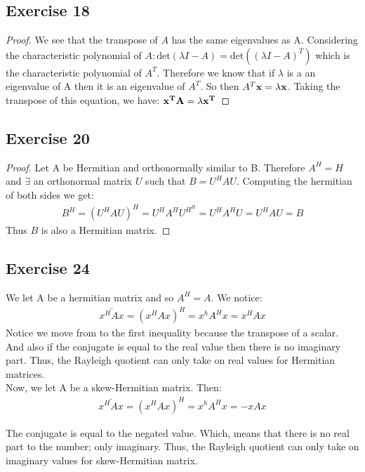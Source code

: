 \documentclass[11.5pt, letterpaper, bibtotoc,
    tablecaptionabove, figurecaptionabove]{article}
\begin{document}
\subsection*{Exercise 18}
\begin{proof}
We see that the transpose of $A$ has the same eigenvalues as A.  Considering the characteristic polynomial of $A: \text{det}(\lambda I - A) = \text{det}((\lambda I - A)^T )$ which is the characteristic polynomial of $A^T$.  Therefore we know that if $\lambda$ is a an eigenvalue of A then it is an eigenvalue of $A^T$.  So then $A^T \bf x= \lambda \bf x$.   Taking the transpose of this equation, we have: $\bf{x^T} A = \lambda \bf {x^T}$
\end{proof}

\subsection*{Exercise 20}
\begin{proof}
Let A be Hermitian and orthonormally similar to B. Therefore $ A^H = H$ and $\exists$ an orthonormal matrix $U$ such that $B=U^HAU$.  Computing the hermitian of both sides we get:
\begin{align*}
	B^H = (U^HAU)^H = U^HA^HU^{H^H} = U^HA^HU = U^HAU = B
\end{align*}
Thus $B$ is also a Hermitian matrix.
\end{proof}

\subsection*{Exercise 24}
We let A be a hermitian matrix and so $A^H = A$.  We notice:
\begin{align*}
	\bar{x^HAx} = (x^HAx)^H = x^hA^Hx = x^HAx
\end{align*}
Notice we move from to the first inequality because the transpose of a scalar. And also if the conjugate is equal to the real value then there is no imaginary part.  Thus, the Rayleigh quotient can only take on real values for Hermitian matrices.\\
Now, we let A be a skew-Hermitian matrix.  Then:
\begin{align*}
	\bar{x^HAx} = (x^HAx)^H = x^hA^Hx = -xAx
\end{align*}

The conjugate is equal to the negated value.  Which, means that there is no real part to the number; only imaginary.  Thus, the Rayleigh quotient can only take on imaginary values for skew-Hermitian matrix.
\end{document}
